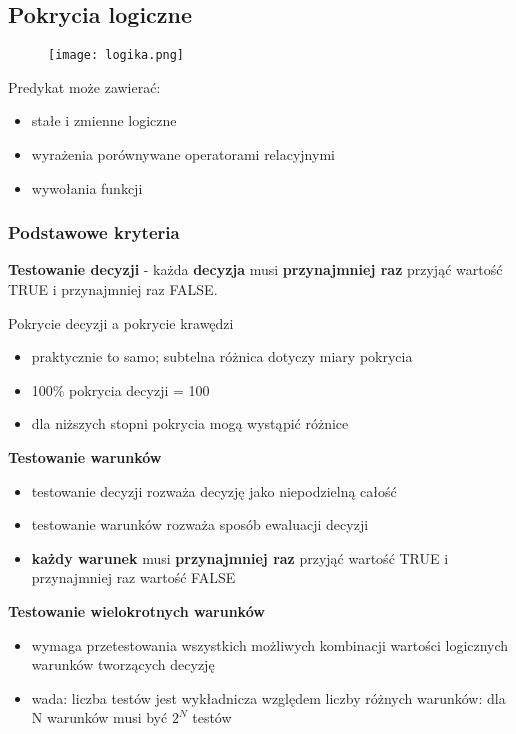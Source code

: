 \documentclass[../main.tex]{subfiles}
\begin{document}
    \subsection{Pokrycia logiczne}

    \begin{figure}[H]
        \texttt{[image: logika.png]}
    \end{figure}

    Predykat może zawierać:
    \begin{itemize}
        \item stałe i zmienne logiczne
        \item wyrażenia porównywane operatorami relacyjnymi
        \item wywołania funkcji
    \end{itemize}

    \subsubsection{Podstawowe kryteria}

    \textbf{Testowanie decyzji} - każda \textbf{decyzja} musi \textbf{przynajmniej raz} przyjąć wartość TRUE i
    przynajmniej raz FALSE.

    Pokrycie decyzji a pokrycie krawędzi
    \begin{itemize}
        \item praktycznie to samo; subtelna różnica dotyczy miary pokrycia
        \item 100\% pokrycia decyzji = 100%
        \item dla niższych stopni pokrycia mogą wystąpić różnice
    \end{itemize}


    \textbf{Testowanie warunków}
    \begin{itemize}
        \item testowanie decyzji rozważa decyzję jako niepodzielną całość
        \item testowanie warunków rozważa sposób ewaluacji decyzji
        \item \textbf{każdy warunek} musi \textbf{przynajmniej raz} przyjąć wartość TRUE i przynajmniej raz wartość FALSE
    \end{itemize}



    \textbf{Testowanie wielokrotnych warunków}
    \begin{itemize}
        \item wymaga przetestowania wszystkich możliwych kombinacji wartości
        logicznych warunków tworzących decyzję
        \item wada: liczba testów jest wykładnicza względem liczby różnych
        warunków: dla N warunków musi być $2^N$ testów
    \end{itemize}
\end{document}
